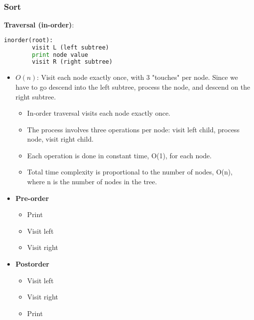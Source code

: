 \subsubsection{Sort}
\begin{definition}
    \textbf{Traversal (in-order)}:

    \begin{lstlisting}[language=Python, caption={In-order Traversal}]
    inorder(root):
        visit L (left subtree)
        print node value
        visit R (right subtree)
    \end{lstlisting}
    \begin{itemize}
        \item $O(n)$: Visit each node exactly once, with 3 "touches" per node. Since we have to go descend into the left subtree, process the node, and descend on the right subtree.
        \begin{itemize}
            \item In-order traversal visits each node exactly once.
            \item The process involves three operations per node: visit left child, process node, visit right child.
            \item Each operation is done in constant time, O(1), for each node.
            \item Total time complexity is proportional to the number of nodes, O(n), where n is the number of nodes in the tree.
        \end{itemize}
        \item \textbf{Pre-order}
        \begin{itemize}
            \item Print 
            \item Visit left 
            \item Visit right
        \end{itemize}
        \item \textbf{Postorder}
        \begin{itemize}
            \item Visit left 
            \item Visit right
            \item Print 
        \end{itemize}
    \end{itemize}
\end{definition}

